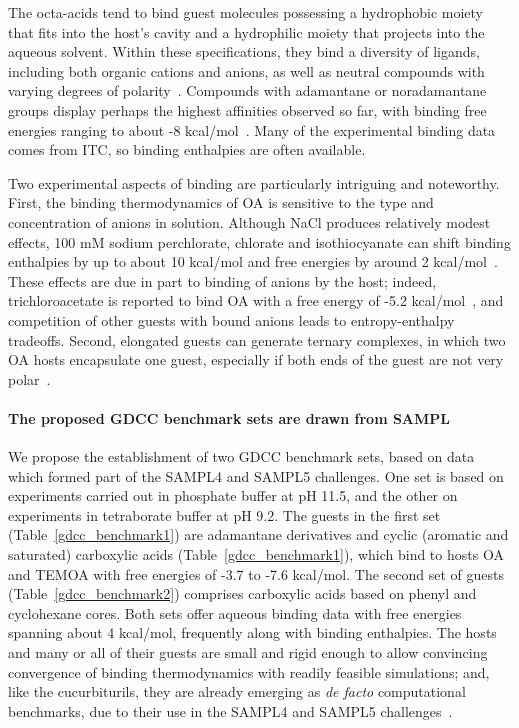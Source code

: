 \documentclass[aps,pre,twocolumn,nofootinbib,superscriptaddress,10pt, final,tightenlines]{revtex4-1}
\begin{document}
The octa-acids tend to bind guest molecules possessing a hydrophobic moiety that fits into the host's cavity and a hydrophilic moiety that projects into the aqueous solvent.  
Within these specifications, they bind a diversity of ligands, including both organic cations and anions, as well as neutral compounds with varying degrees of polarity~\cite{gibb_guests_2009, gibb_binding_2013}.  
Compounds with adamantane or noradamantane groups display perhaps the highest affinities observed so far, with binding free energies ranging to about -8 kcal/mol~\cite{sun_calorimetric_2008}.  
Many of the experimental binding data comes from ITC, so binding enthalpies are often available. 

Two experimental aspects of binding are particularly intriguing and noteworthy. 
First, the binding thermodynamics of OA is sensitive to the type and concentration of anions in solution. 
Although NaCl produces relatively modest effects, 100 mM sodium perchlorate, chlorate and isothiocyanate can shift binding enthalpies by up to about 10 kcal/mol and free energies by around 2 kcal/mol~\cite{gibb_anion_2011}. 
These effects are due in part to binding of anions by the host; indeed, trichloroacetate is reported to bind OA with a free energy of -5.2 kcal/mol~\cite{sokkalingam_binding_2016}, and competition of other guests with bound anions leads to entropy-enthalpy tradeoffs. 
Second, elongated guests can generate ternary complexes, in which two OA hosts encapsulate one guest, especially if both ends of the guest are not very polar~\cite{gibb_guests_2009}.  

\paragraph{The proposed GDCC benchmark sets are drawn from SAMPL}
We propose the establishment of two GDCC benchmark sets, based on data which formed part of the SAMPL4 and SAMPL5 challenges.
One set is based on experiments carried out in phosphate buffer at pH 11.5, and the other on experiments in tetraborate buffer at pH 9.2.
The guests in the first set (Table~\ref{gdcc_benchmark1}) are adamantane derivatives and cyclic (aromatic and saturated) carboxylic acids (Table~\ref{gdcc_benchmark1}), which bind to hosts OA and TEMOA with free energies of -3.7 to -7.6 kcal/mol.
The second set of guests (Table~\ref{gdcc_benchmark2}) comprises carboxylic acids based on phenyl and cyclohexane cores.
Both sets offer aqueous binding data with free energies spanning about 4 kcal/mol, frequently along with binding enthalpies.
The hosts and many or all of their guests are small and rigid enough to allow convincing convergence of binding thermodynamics with readily feasible simulations; and, like the cucurbiturils, they are already emerging as \emph{de facto} computational benchmarks, due to their use in the SAMPL4 and SAMPL5 challenges~\cite{muddana_sampl4_2014, yin_overview_2016}. 
\end{document}
